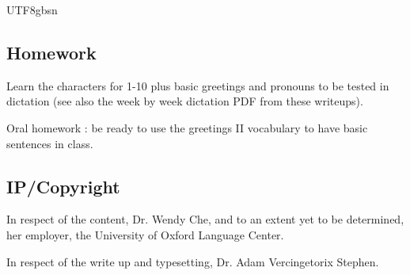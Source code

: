 \documentclass{article}
\newcommand{\myfont}{gbsn} %
\begin{document}
\begin{CJK}{UTF8}{\myfont}
\subsection{Homework}

Learn the characters for 1-10 plus basic greetings and pronouns to be tested in dictation (see also the week by week dictation PDF from these writeups).

Oral homework : be ready to use the greetings II vocabulary to have basic sentences in class.

  \subsection{IP/Copyright}
  
  In respect of the content, Dr. Wendy Che, and to an extent yet to be determined, her employer, the University of Oxford Language Center.

In respect of the write up and typesetting, Dr. Adam Vercingetorix Stephen.


\end{CJK} 
\end{document}
